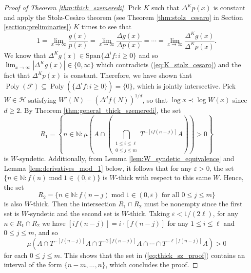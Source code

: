 \documentclass[12pt]{article}
\theoremstyle{plain} %
\theoremstyle{definition} %
\theoremstyle{plain}
\theoremstyle{plain}
\numberwithin{equation}{section}
\newcommand{\Cesaro}{Ces\`{a}ro }
\newcommand{\N}{\mathbb{N}}
\renewcommand{\epsilon}{\varepsilon}
\renewcommand{\leq}{\leqslant}
\renewcommand{\geq}{\geqslant}
\renewcommand{\subset}{\subseteq}
\newcommand{\1}{\mathbbm{1}}
\newcommand{\Poly}{\operatorname{Poly}}
\newcommand{\oo}{\infty}
\newcommand{\round}[1]{[ #1 ]}
\renewcommand{\mod}{\operatorname{mod}}
\begin{document}
\begin{proof}[Proof of Theorem \ref{thm:thick_szemeredi}]
   
   Pick $K$ such that $\Delta^Kp(x)$ is constant and apply the Stolz-\Cesaro theorem (see Theorem \ref{thm:stolz_cesaro} in Section \ref{section:preliminaries}) $K$ times to see that
   \begin{equation}\label{eq:K_stolz_cesaro}
       1 = \lim_{x\to\oo}\frac{g(x)}{p(x)}=\lim_{x\to\oo}\frac{\Delta g(x)}{\Delta p(x)}=\cdots =\lim_{x\to\oo}\frac{\Delta^K g(x)}{\Delta^K p(x)}.
   \end{equation}
   We know that $\Delta^K g(x) \in  \text{Span}\{\Delta^if:i\geq 0\}$ and so $\lim_{x\to\oo}|\Delta^K g(x)| \in \{0,\oo\}$ which contradicts (\ref{eq:K_stolz_cesaro}) and the fact that $\Delta^Kp(x)$ is constant. Therefore, we have shown that $\Poly(\mathscr{F}) \subset \Poly(\{\Delta^if:i\geq 0\})= \{0\}$, which is jointly intersective. Pick $W\in \mathcal{H}$ satisfying $W'(N) = (\Delta^{d}f(N))^{1/d}$, so that $\log x\prec \log W(x)$ since $d\geq 2$. By Theorem \ref{thm:general_thick_szemeredi}, the set 
   \begin{equation}
       R_1=\left\{n\in \N:\mu\left(A\cap \left(\bigcap_{\substack{1\leq i\leq \ell\\ 0\leq j\leq m}}T^{-\round{if(n-j)}}A\right)\right)>0\right\}
   \end{equation}
   is $W$-syndetic. Additionally, from Lemma \ref{lem:W_syndetic_equivalence} and Lemma \ref{lem:derivatives_mod_1} below, it follows that for any $\epsilon>0$, the set $\{n\in \N: f(n)\mod 1\in (0,\epsilon)\}$ is $W$-thick with respect to this same $W$. Hence, the set 
   \begin{equation} 
   R_2=\{n\in \N: f(n-j)\mod 1\in (0,\epsilon)\text{ for all } 0\leq j\leq m\}
   \end{equation} 
   is also $W$-thick. Then the intersection $R_1\cap R_2$ must be nonempty since the first set is $W$-syndetic and the second set is $W$-thick. Taking $\epsilon<1/(2\ell)$, for any $n\in R_1\cap R_2$ we have $\round{if(n-j)} = i\cdot \round{f(n-j)}$ for any $1\leq i\leq \ell$ and $0\leq j\leq m$, and so 
   \begin{equation}
       \mu(A\cap T^{-\round{f(n-j)}}A\cap T^{-2\round{f(n-j)}}A\cap\cdots \cap T^{-\ell\round{f(n-j)}}A)>0
   \end{equation}
   for each $0\leq j\leq m$. This shows that the set in (\ref{eq:thick_sz_proof}) contains an interval of the form $\{n-m,\dots, n\}$, which concludes the proof.
\end{proof}
\end{document}

